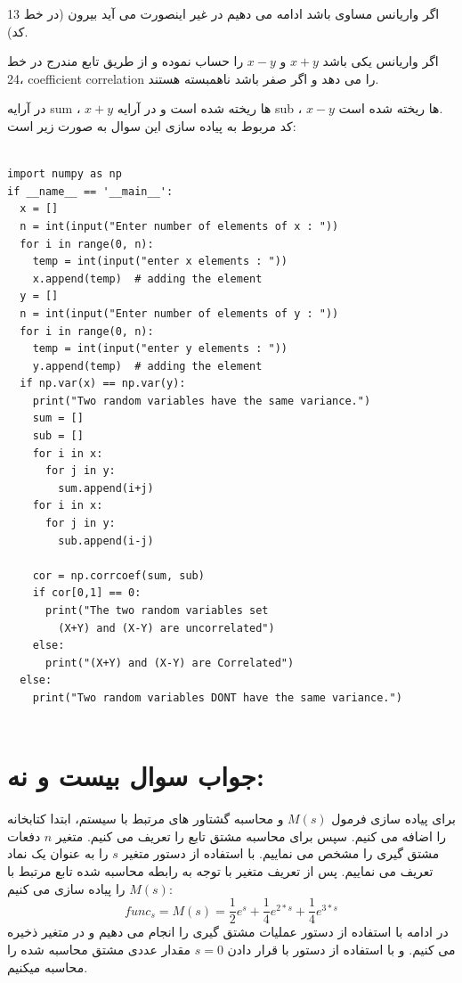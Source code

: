 \documentclass[a4paper,14pt]{article}
\begin{document}
اگر واریانس مساوی باشد ادامه می دهیم در غیر اینصورت می آید بیرون (در خط 13 کد).

اگر واریانس یکی باشد
$x+y$ 
و
$x-y$
را حساب نموده و از طریق تابع مندرج در خط 24، 
coefficient correlation 
را می دهد و اگر صفر باشد ناهمبسته هستند.

در آرایه sum ،
$x+y$
ها ریخته شده است و در آرایه sub ،
$x-y$
ها ریخته شده است.\\

کد مربوط به پیاده سازی این سوال به صورت زیر است:\\

\fontsize{12}{12}\selectfont
\begin{latin}
	\begin{lstlisting}
		
import numpy as np
if __name__ == '__main__':
  x = []
  n = int(input("Enter number of elements of x : "))
  for i in range(0, n):
    temp = int(input("enter x elements : "))
    x.append(temp)  # adding the element
  y = []
  n = int(input("Enter number of elements of y : "))
  for i in range(0, n):
    temp = int(input("enter y elements : "))
    y.append(temp)  # adding the element
  if np.var(x) == np.var(y):
    print("Two random variables have the same variance.")
    sum = []
    sub = []
    for i in x:
      for j in y:
        sum.append(i+j)
    for i in x:
      for j in y:
        sub.append(i-j)

    cor = np.corrcoef(sum, sub)
    if cor[0,1] == 0:
      print("The two random variables set 
        (X+Y) and (X-Y) are uncorrelated")
    else:
      print("(X+Y) and (X-Y) are Correlated")
  else:
    print("Two random variables DONT have the same variance.")
		
	\end{lstlisting}
\end{latin}
\fontsize{14}{14}\selectfont

\section*{جواب سوال بیست و نه:}
برای پیاده سازی فرمول 
$M(s)$
و محاسبه گشتاور های مرتبط با سیستم، ابتدا کتابخانه 
را اضافه می کنیم. سپس برای محاسبه مشتق تابع 
را تعریف می کنیم. متغیر
$n$
دفعات مشتق گیری را مشخص
می نماییم.
با استفاده از دستور 
متغیر 
$s$
را به عنوان یک نماد تعریف می نماییم. پس از تعریف متغیر با توجه به رابطه محاسبه شده تابع مرتبط با 
$M(s)$
را پیاده سازی می کنیم:
$$
func_s=M(s)=\frac{1}{2}e^{s}+\frac{1}{4}e^{2*s}+\frac{1}{4}e^{3*s}
$$ 
در ادامه با استفاده از دستور 
عملیات مشتق گیری را انجام می دهیم و در متغیر 
ذخیره می کنیم.
و با استفاده از دستور
با قرار دادن
$s=0$
مقدار عددی مشتق محاسبه شده را محاسبه میکنیم.
\end{document}
